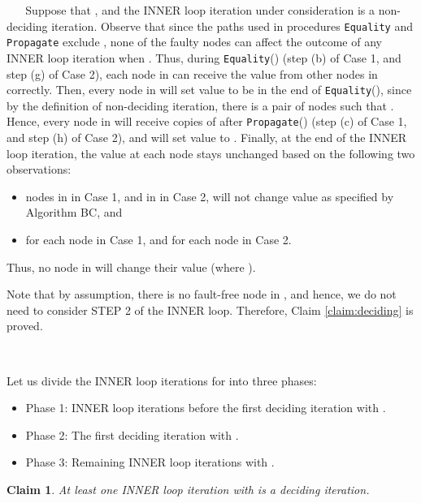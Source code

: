 \documentclass[letterpaper, 11pt]{article}
\newenvironment{proof}{\noindent {\bf Proof:}~}{\hspace*{\fill}}
\newtheorem{claim}{Claim}
\newcommand{\Propagate}{{\tt Propagate}}
\newcommand{\Equality}{{\tt Equality}}
\begin{document}
\begin{proof}
\begin{proof}
Suppose that , and the INNER loop iteration under consideration is a non-deciding iteration. Observe that since the paths used in procedures {\tt Equality} and {\tt Propagate} exclude , none of the faulty nodes can affect the outcome of any INNER loop iteration when . Thus, during \Equality() (step (b) of Case 1, and step (g) of Case 2), each node in  can receive the value from other nodes in  correctly. Then, every node in  will set value  to be  in the end of \Equality(), since by the definition of non-deciding iteration, there is a pair of nodes  such that . Hence, every node in  will receive  copies of  after \Propagate() (step (c) of Case 1, and step (h) of Case 2), and will set value  to . Finally, at the end of the INNER loop iteration, the value  at each node stays unchanged based on the following two observations:

\begin{itemize}
\item nodes in  in Case 1, and in  in Case 2, will not change value  as specified by Algorithm BC, and

\item  for each node  in Case 1, and for each node 
in Case 2.
\end{itemize}
Thus, no node in  will change their  value (where ).

Note that by assumption, there is no fault-free node in , and hence, we do not need to consider STEP 2 of the INNER loop. Therefore, Claim \ref{claim:deciding} is proved.
\end{proof}

~

Let us divide the INNER loop iterations for  into three phases:
\begin{itemize}
\item Phase 1: INNER loop iterations before the first deciding iteration with .

\item Phase 2: The first deciding iteration with .

\item Phase 3: Remaining INNER loop iterations with .

\end{itemize}

\begin{claim}
\label{claim:phase2}
At least one INNER loop iteration with  is a deciding iteration.
\end{claim}


\end{proof}
\end{document}
